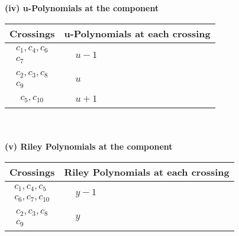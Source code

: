 \documentclass[1p]{elsarticle_modified}
\theoremstyle{definition}
\begin{document}
\newpage\renewcommand{\arraystretch}{1}
\flushleft \textbf{(iv) u-Polynomials at the component}\newline \\
\begin{tabular}{m{50pt}|m{274pt}}
Crossings & \hspace{64pt}u-Polynomials at each crossing \\
\hline $$\begin{aligned}c_{1},c_{4},c_{6}\\c_{7}\end{aligned}$$&$\begin{aligned}
&u-1
\end{aligned}$\\
\hline $$\begin{aligned}c_{2},c_{3},c_{8}\\c_{9}\end{aligned}$$&$\begin{aligned}
&u
\end{aligned}$\\
\hline $$\begin{aligned}c_{5},c_{10}\end{aligned}$$&$\begin{aligned}
&u+1
\end{aligned}$\\
\hline
\end{tabular}\\~\\
\newpage\renewcommand{\arraystretch}{1}
\flushleft \textbf{(v) Riley Polynomials at the component}\newline \\
\begin{tabular}{m{50pt}|m{274pt}}
Crossings & \hspace{64pt}Riley Polynomials at each crossing \\
\hline $$\begin{aligned}c_{1},c_{4},c_{5}\\c_{6},c_{7},c_{10}\end{aligned}$$&$\begin{aligned}
&y-1
\end{aligned}$\\
\hline $$\begin{aligned}c_{2},c_{3},c_{8}\\c_{9}\end{aligned}$$&$\begin{aligned}
&y
\end{aligned}$\\
\hline
\end{tabular}\\~\\
\end{document}
